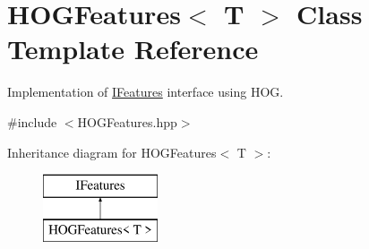 \hypertarget{class_h_o_g_features}{\section{H\-O\-G\-Features$<$ T $>$ Class Template Reference}
\label{class_h_o_g_features}
}


Implementation of \hyperlink{class_i_features}{I\-Features} interface using H\-O\-G.  




{\ttfamily \#include $<$H\-O\-G\-Features.\-hpp$>$}

Inheritance diagram for H\-O\-G\-Features$<$ T $>$\-:\begin{figure}[H]
\begin{center}
\leavevmode
\includegraphics[height=2.000000cm]{class_h_o_g_features}
\end{center}
\end{figure}
